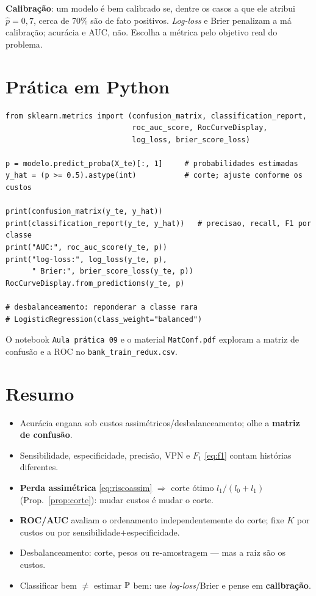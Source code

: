 \documentclass[11pt,a4paper]{article}
\begin{document}
\begin{ideia}
\textbf{Calibração}: um modelo é bem calibrado se, dentre os casos a que ele atribui
$\widehat p=0{,}7$, cerca de 70\% são de fato positivos. \emph{Log-loss} e Brier
penalizam a má calibração; acurácia e AUC, não. Escolha a métrica pelo objetivo
real do problema.
\end{ideia}

\section{Prática em Python}
\begin{lstlisting}
from sklearn.metrics import (confusion_matrix, classification_report,
                             roc_auc_score, RocCurveDisplay,
                             log_loss, brier_score_loss)

p = modelo.predict_proba(X_te)[:, 1]     # probabilidades estimadas
y_hat = (p >= 0.5).astype(int)           # corte; ajuste conforme os custos

print(confusion_matrix(y_te, y_hat))
print(classification_report(y_te, y_hat))   # precisao, recall, F1 por classe
print("AUC:", roc_auc_score(y_te, p))
print("log-loss:", log_loss(y_te, p),
      " Brier:", brier_score_loss(y_te, p))
RocCurveDisplay.from_predictions(y_te, p)

# desbalanceamento: reponderar a classe rara
# LogisticRegression(class_weight="balanced")
\end{lstlisting}
O notebook \texttt{Aula prática 09} e o material \texttt{MatConf.pdf} exploram a
matriz de confusão e a ROC no \texttt{bank\_train\_redux.csv}.

\section*{Resumo}
\begin{itemize}[leftmargin=1.4cm]
  \item Acurácia engana sob custos assimétricos/desbalanceamento; olhe a
        \textbf{matriz de confusão}.
  \item Sensibilidade, especificidade, precisão, VPN e $F_1$ \eqref{eq:f1} contam
        histórias diferentes.
  \item \textbf{Perda assimétrica} \eqref{eq:riscoassim} $\Rightarrow$ corte ótimo
        $l_1/(l_0+l_1)$ (Prop.~\ref{prop:corte}): mudar custos é mudar o corte.
  \item \textbf{ROC/AUC} avaliam o ordenamento independentemente do corte; fixe $K$
        por custos ou por sensibilidade$+$especificidade.
  \item Desbalanceamento: corte, pesos ou re-amostragem --- mas a raiz são os
        custos.
  \item Classificar bem $\neq$ estimar $\mathbb{P}$ bem: use \emph{log-loss}/Brier e
        pense em \textbf{calibração}.
\end{itemize}
\end{document}
